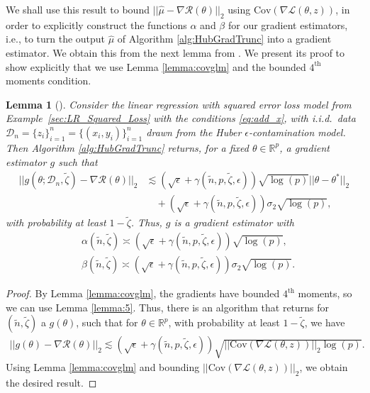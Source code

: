 \documentclass{article}
\newtheorem{lemma}{Lemma}
\begin{document}
We shall use this result to bound $||\widehat{\mu} - \nabla\mathcal{R}(\theta)||_2$ using $\mathrm{\mathrm{Cov}}(\nabla \mathcal{L}(\theta, z))$, in order to explicitly construct the functions $\alpha$ and $\beta$ for our gradient estimators, i.e., to turn the output $\widehat{\mu}$ of Algorithm \ref{alg:HubGradTrunc} into a gradient estimator. We obtain this from the next lemma from \cite{RE}. We present its proof to show explicitly that we use Lemma \ref{lemma:covglm} and the bounded $4^{\text{th}}$ moments condition.
\begin{lemma}[\cite{RE}]
\label{lemma:geglmhb}
Consider the linear regression with squared error loss model from Example~\ref{sec:LR_Squared_Loss} with the conditions \eqref{eq:add_x}, with i.i.d.\ data $\mathcal{D}_n = \{z_i\}_{i = 1}^n = \{(x_i, y_i)\}_{i = 1}^n$ drawn from the Huber $\epsilon$-contamination model. Then Algorithm \ref{alg:HubGradTrunc} returns, for a fixed $\theta \in \mathbb{R}^p$, a gradient estimator $g$ such that
\begin{align*}
||g(\theta; \mathcal{D}_n, \widetilde{\zeta}) - \nabla\mathcal{R}(\theta)||_2 &\lesssim (\sqrt{\epsilon} + \gamma(\widetilde{n}, p, \widetilde{\zeta}, \epsilon))\sqrt{\log(p)}||\theta - \theta^*||_2\\
& \quad + (\sqrt{\epsilon} + \gamma(\widetilde{n}, p, \widetilde{\zeta}, \epsilon))\sigma_2\sqrt{\log(p)},
\end{align*}
with probability at least $1 - \widetilde{\zeta}$. Thus, $g$ is a gradient estimator with
\begin{align}
\label{eq:hua}
&\alpha(\widetilde{n}, \widetilde{\zeta}) \asymp (\sqrt{\epsilon} + \gamma(\widetilde{n}, p, \widetilde{\zeta}, \epsilon))\sqrt{\log(p)}, \\
\label{eq:hub}
&\beta(\widetilde{n}, \widetilde{\zeta}) \asymp (\sqrt{\epsilon} + \gamma(\widetilde{n}, p, \widetilde{\zeta}, \epsilon))\sigma_2\sqrt{\log(p)}.
\end{align}
\end{lemma}

\begin{proof}
By Lemma \ref{lemma:covglm}, the gradients have bounded $4^{\text{th}}$ moments, so we can use Lemma \ref{lemma:5}. Thus, there is an algorithm that returns for $(\widetilde{n}, \widetilde{\zeta})$ a $g(\theta)$, such that for $\theta \in \mathbb{R}^p$, with probability at least $1 - \widetilde{\zeta}$, we have
\begin{align*}
||g(\theta) - \nabla\mathcal{R}(\theta)||_2 \lesssim (\sqrt{\epsilon} + \gamma(\widetilde{n}, p, \widetilde{\zeta}, \epsilon))\sqrt{||\mathrm{\mathrm{Cov}}(\nabla \mathcal{L}(\theta, z))||_2\log(p)}.
\end{align*}
Using Lemma \ref{lemma:covglm} and bounding $||\mathrm{\mathrm{Cov}}(\nabla \mathcal{L}(\theta, z))||_2$, we obtain the desired result.
\end{proof}
\end{document}
